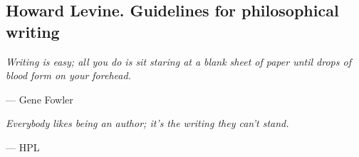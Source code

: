 \subsection*{Howard Levine. Guidelines for philosophical writing}

\begin{flushright}
\parbox{7cm}{\sl Writing is easy; all you do is sit staring at a blank sheet of paper until drops of blood form on your forehead.}

--- Gene Fowler

\bigskip

\parbox{7cm}{\sl Everybody likes being an author; it’s the writing they can’t stand.} 

--- HPL
\end{flushright}

